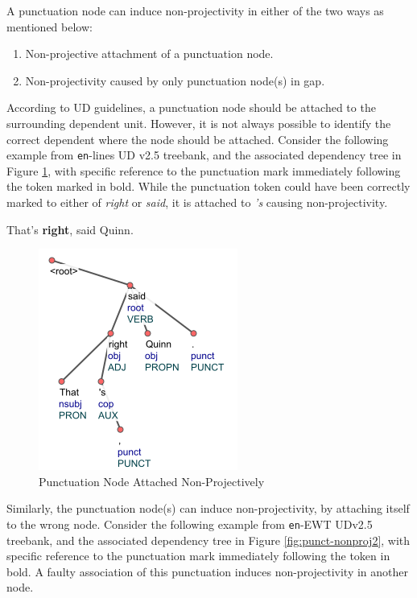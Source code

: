 A punctuation node can induce non-projectivity in either of the two ways as mentioned below:

\begin{enumerate}
    \item Non-projective attachment of a punctuation node.
    \item Non-projectivity caused by only punctuation node(s) in gap.
\end{enumerate}

According to UD guidelines, a punctuation node should be attached to the surrounding dependent unit. However, it is not always possible to identify the correct dependent where the node should be attached. Consider the following example from \verb|en|-lines UD v2.5 treebank, and the associated dependency tree in Figure \ref{fig:punct-nonproj}, with specific reference to the punctuation mark immediately following the token marked in bold. While the punctuation token could have been correctly marked to either of \textit{right} or \textit{said}, it is attached to \textit{'s} causing non-projectivity.

\begin{example}
That's \textbf{right}, said Quinn.
\end{example}

\begin{figure}[H]
    \centering
    \includegraphics{img/punct-nonproj.png}
    \caption{Punctuation Node Attached Non-Projectively}
    \label{fig:punct-nonproj}
\end{figure}

Similarly, the punctuation node(s) can induce non-projectivity, by attaching itself to the wrong node. Consider the following example from \verb|en|-EWT UDv2.5 treebank, and the associated dependency tree in Figure \ref{fig:punct-nonproj2}, with specific reference to the punctuation mark immediately following the token in bold. A faulty association of this punctuation induces non-projectivity in another node.

